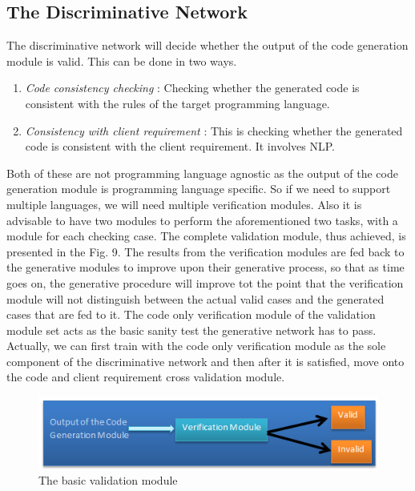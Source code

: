\documentclass[conference]{IEEEtran}
\begin{document}
\subsection{The Discriminative Network}

The discriminative network will decide whether the output of the code generation module is valid. This can be done in two ways.

\begin{enumerate}
	\item\textit{Code consistency checking} : Checking whether the generated code is consistent with the rules of the target programming language.
	\item\textit{Consistency with client requirement} : This is checking whether the generated code is consistent with the client requirement. It involves NLP. 	
\end{enumerate}

Both of these are not programming language agnostic as the output of the code generation module is programming language specific. So if we need to support multiple languages, we will need multiple verification modules. Also it is advisable to have two modules to perform the aforementioned two tasks, with a module for each checking case. The complete validation module, thus achieved, is presented in the Fig. 9.\newline
The results from the verification modules are fed back to the generative modules to improve upon their generative process, so that as time goes on, the generative procedure will improve tot the point that the verification module will not distinguish between the actual valid cases and the generated cases that are fed to it.\newline
The code only verification module of the validation module set acts as the basic sanity test the generative network has to pass. Actually, we can first train with the code only verification module as the sole component of the discriminative network and then after it is satisfied, move onto the code and client requirement cross validation module.

\begin{figure}
	\includegraphics[width=\linewidth]{Validation_module.png}
	\caption{The basic validation module}
	\label{fig8}
\end{figure} 
\end{document}
